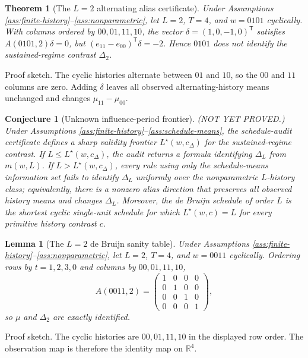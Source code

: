 \documentclass[11pt]{article}
\newcommand{\transpose}{\mathsf{T}}
\newcommand{\R}{\mathbb{R}}
\theoremstyle{definition}
\theoremstyle{plain}
\newtheorem{theorem}{Theorem}
\newtheorem{conjecture}{Conjecture}
\newtheorem{lemma}{Lemma}
\theoremstyle{remark}
\begin{document}
\begin{theorem}[The \(L=2\) alternating alias certificate]\label{thm:l2-alias}
Under Assumptions \ref{ass:finite-history}--\ref{ass:nonparametric}, let \(L=2\), \(T=4\), and \(w=0101\) cyclically. With columns ordered by \(00,01,11,10\), the vector \(\delta=(1,0,-1,0)^{\transpose}\) satisfies \(A(0101,2)\delta=0\), but \((e_{11}-e_{00})^{\transpose}\delta=-2\). Hence \(0101\) does not identify the sustained-regime contrast \(\Delta_2\).
\end{theorem}
Proof sketch. The cyclic histories alternate between \(01\) and \(10\), so the \(00\) and \(11\) columns are zero. Adding \(\delta\) leaves all observed alternating-history means unchanged and changes \(\mu_{11}-\mu_{00}\).

\begin{conjecture}[Unknown influence-period frontier]\label{conj:unknown-L-frontier}
(NOT YET PROVED.) Under Assumptions \ref{ass:finite-history}--\ref{ass:schedule-means}, the schedule-audit certificate defines a sharp validity frontier \(L^\star(w,c_\Delta)\) for the sustained-regime contrast. If \(L\leq L^\star(w,c_\Delta)\), the audit returns a formula identifying \(\Delta_L\) from \(m(w,L)\). If \(L>L^\star(w,c_\Delta)\), every rule using only the schedule-means information set fails to identify \(\Delta_L\) uniformly over the nonparametric \(L\)-history class; equivalently, there is a nonzero alias direction that preserves all observed history means and changes \(\Delta_L\). Moreover, the de Bruijn schedule of order \(L\) is the shortest cyclic single-unit schedule for which \(L^\star(w,c)=L\) for every primitive history contrast \(c\).
\end{conjecture}

\begin{lemma}[The \(L=2\) de Bruijn sanity table]\label{lem:l2-debruijn}
Under Assumptions \ref{ass:finite-history}--\ref{ass:nonparametric}, let \(L=2\), \(T=4\), and \(w=0011\) cyclically. Ordering rows by \(t=1,2,3,0\) and columns by \(00,01,11,10\),
\[
A(0011,2)=
\begin{pmatrix}
1&0&0&0\\
0&1&0&0\\
0&0&1&0\\
0&0&0&1
\end{pmatrix},
\]
so \(\mu\) and \(\Delta_2\) are exactly identified.
\end{lemma}
Proof sketch. The cyclic histories are \(00,01,11,10\) in the displayed row order. The observation map is therefore the identity map on \(\R^4\).
\end{document}
